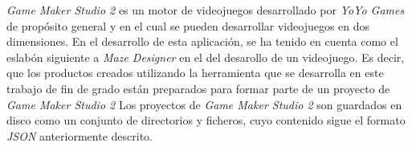 \textit{Game Maker Studio 2}\cite{gamemaker} es un motor de videojuegos desarrollado por \textit{YoYo Games} de propósito general y en el cual se pueden desarrollar videojuegos en dos dimensiones.
En el desarrollo de esta aplicación, se ha tenido en cuenta como el eslabón siguiente a \textit{Maze Designer} en el  del desarollo de un videojuego. Es decir, que los productos creados utilizando la herramienta que se desarrolla en este trabajo de fin de grado están preparados para formar parte de un proyecto de \textit{Game Maker Studio 2}
Los proyectos de \textit{Game Maker Studio 2} son guardados en disco como un conjunto de directorios y ficheros, cuyo contenido sigue el formato \textit{JSON} anteriormente descrito.